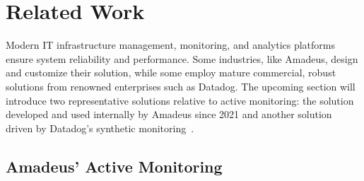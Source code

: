 
\chapter{Related Work}\label{chapter:related_work}

Modern IT infrastructure management, monitoring, and analytics platforms ensure system reliability and performance. Some industries, like Amadeus, design and customize their solution, while some employ mature commercial, robust solutions from renowned enterprises such as Datadog. The upcoming section will introduce two representative solutions relative to active monitoring: the solution developed and used internally by Amadeus since 2021 and another solution driven by Datadog's synthetic monitoring~\parencite{datadogSyntheticMonitoring}. 

\section{Amadeus' Active Monitoring}

